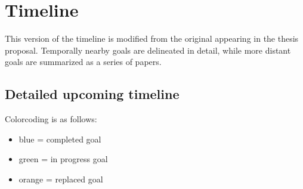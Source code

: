 \documentclass[11pt]{article}
\begin{document}
\section*{Timeline}

This version of the timeline is modified from the original appearing in the thesis proposal. Temporally nearby goals are delineated in detail, while more distant goals are summarized as a series of papers. 

\subsection*{Detailed upcoming timeline}
Colorcoding is as follows:
    
    \begin{itemize}
    	\item {\color{RoyalBlue}blue} = completed goal
    	\item {\color{ForestGreen} green} = in progress goal
    	\item {\color{BurntOrange} orange} = replaced goal
    \end{itemize}
\end{document}
